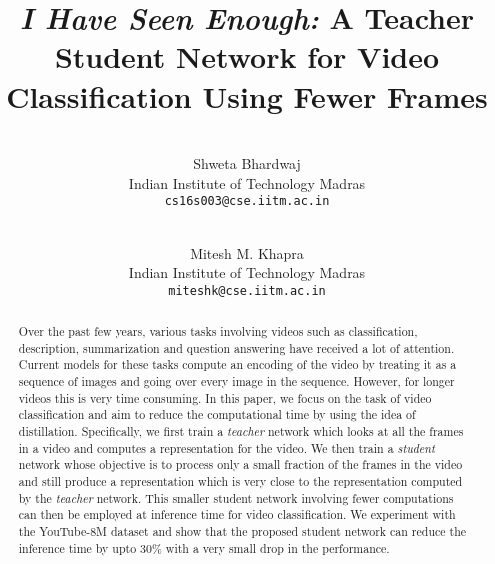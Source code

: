 \documentclass[10pt,twocolumn,letterpaper]{article}
\begin{document}
\title{\textit{I Have Seen Enough:} A Teacher Student Network for Video Classification Using Fewer Frames}

\author{\\
Shweta Bhardwaj\\
Indian Institute of Technology Madras\\
{\tt\small cs16s003@cse.iitm.ac.in}
\and
\\
Mitesh M. Khapra\\
Indian Institute of Technology Madras\\
{\tt\small miteshk@cse.iitm.ac.in}
}

\maketitle

\begin{abstract}
Over the past few years, various tasks involving videos such as classification, description, summarization and question answering have received a lot of attention. Current models for these tasks compute an encoding of the video by treating it as a sequence of images and going over every image in the sequence. However, for longer videos this is very time consuming. In this paper, we focus on the task of video classification and aim to reduce the computational time by using the idea of distillation. Specifically, we first train a \textit{teacher} network which looks at all the frames in a video and computes a representation for the video. We then train a \textit{student} network whose objective is to process only a small fraction of the frames in the video and still produce a representation which is very close to the representation computed by the \textit{teacher} network. This smaller student network involving fewer computations can then be employed at inference time for video classification. We experiment with the YouTube-8M dataset and show that the proposed student network can reduce the inference time by upto $30\%$ with a very small drop in the performance. 


\end{abstract}
\end{document}
